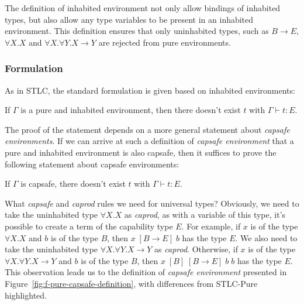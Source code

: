 The definition of inhabited environment not only allow bindings of
inhabited types, but also allow any type variables to be present in an
inhabited environment. This definition ensures that only uninhabited
types, such as $B \to E$, $\forall X.X$ and
$\forall X.\forall Y.X \to Y$ are rejected from pure environments.

\subsubsection{Formulation}

As in STLC, the standard formulation is given based on inhabited
environments:

\begin{definition}
  If $\Gamma$ is a pure and inhabited environment, then there doesn't
  exist $t$ with $\Gamma \vdash t : E$.
\end{definition}

The proof of the statement depends on a more general statement about
\emph{capsafe environments}. If we can arrive at such a definition of
\emph{capsafe environment} that a pure and inhabited environment is
also capsafe, then it suffices to prove the following statement about
capsafe environments:

\begin{definition}
  If $\Gamma$ is capsafe, there doesn't exist $t$ with
  $\Gamma \vdash t : E$.
\end{definition}

What \emph{capsafe} and \emph{caprod} rules we need for universal
types? Obviously, we need to take the uninhabited type $\forall X.X$
as \emph{caprod}, as with a variable of this type, it's possible to
create a term of the capability type $E$. For example, if $x$ is of
the type $\forall X.X$ and $b$ is of the type $B$, then
$x \; [B \to E] \; b$ has the type $E$.  We also need to take the
uninhabited type $\forall X. \forall Y. X \to Y$ as
\emph{caprod}. Otherwise, if $x$ is of the type
$\forall X. \forall Y. X \to Y$ and $b$ is of the type $B$, then
$x \; [B] \; [B \to E] \; b \; b$ has the type $E$. This observation
leads us to the definition of \emph{capsafe environment} presented in
Figure~\ref{fig:f-pure-capsafe-definition}, with differences from
STLC-Pure highlighted.

